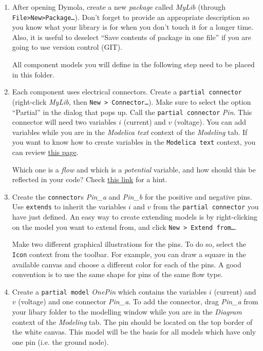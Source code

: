 \documentclass[10pt,a4paper]{article}
\begin{document}
\begin{enumerate}
	\item After opening Dymola, create a new \textit{package} called 
	\textit{MyLib} (through \texttt{File>New>Package\ldots}). Don't forget to 
	provide an appropriate description so you know what your library is for 
	when you don't touch it for a longer time. Also, it is useful to deselect 
	``Save contents of package in one file'' if you are going to use version 
	control (GIT).
	
	All component models you will define in the following step need to be 
	placed in this folder.
	
	\item Each component uses electrical connectors. Create a \texttt{partial 
	connector} (right-click \textit{MyLib}, then \texttt{New > 
	Connector\ldots}). Make sure to select the option ``Partial'' in the dialog 
	that pops up.
	Call the \texttt{partial connector} \textit{Pin}. This connector will need 
	two variables $i$ (current) and $v$ 
	(voltage). You can add variables while you are in the \textit{Modelica 
	text} context of the \textit{Modeling} tab. If you want to know how to 
	create variables in the \texttt{Modelica text} context, you can review 
	\href{http://book.xogeny.com/behavior/equations/variables/#variables}{this page}. 

	Which one is a \textit{flow} and which is a \textit{potential} variable, 
	and how should this be reflected in your code? Check 
	\href{http://book.xogeny.com/components/connectors/simple_domains/#simple-domains}{this
	 link} for a hint.
	
	\item Create the \texttt{connector}s \textit{Pin\_a} and \textit{Pin\_b} 
	for the positive and negative pins.  Use \texttt{extends} to inherit the 
	variables $i$ and $v$ from the \texttt{partial connector} you have just 
	defined. 
	An easy way to create extending models is by right-clicking on the model 
	you want to extend from, and click \texttt{New > Extend from\ldots}.
	
	Make two different graphical illustrations for the pins. To do so, select 
	the \texttt{Icon} context from the toolbar. For example, you can draw a 
	square in the available canvas and choose a different color for each of the 
	pins. A good convention is to use the same shape for pins of the same flow 
	type. 
	
	\item Create a \texttt{partial model} \textit{OnePin} which contains the 
	variables $i$ (current) and $v$ (voltage) and one connector 
	\textit{Pin\_a}. To add the connector, drag \textit{Pin\_a} from your 
	libary folder to the modelling window while you are in the \textit{Diagram} 
	context of the \textit{Modeling} tab. The pin should be located on the top 
	border of the white canvas. This model will be the basis for all models 
	which have only one pin (i.e. the ground node).
	

\end{enumerate}
\end{document}

